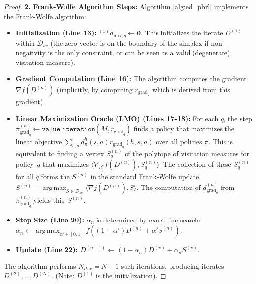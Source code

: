 \documentclass{article}
\DeclareMathOperator*{\argmax}{arg\,max}
\begin{document}
\begin{proof}
\textbf{2. Frank-Wolfe Algorithm Steps:}
Algorithm \ref{alg:ed_pbrl} implements the Frank-Wolfe algorithm:
\begin{itemize}
    \item \textbf{Initialization (Line 13):} ${}^{(1)}d_{\text{mix},q} \leftarrow \mathbf{0}$. This initializes the iterate $D^{(1)}$ within $\mathcal{D}_{sv}$ (the zero vector is on the boundary of the simplex if non-negativity is the only constraint, or can be seen as a valid (degenerate) visitation measure).
    \item \textbf{Gradient Computation (Line 16):} The algorithm computes the gradient $\nabla f(D^{(n)})$ (implicitly, by computing $r_{\text{grad}_q}$ which is derived from this gradient).
    \item \textbf{Linear Maximization Oracle (LMO) (Lines 17-18):} For each $q$, the step $\pi_{\text{grad}_q}^{(n)} \leftarrow \texttt{value\_iteration}(M, r_{\text{grad}_q})$ finds a policy that maximizes the linear objective $\sum_{s,a} d^h_{\pi}(s,a) r_{\text{grad}_q}(h,s,a)$ over all policies $\pi$. This is equivalent to finding a vertex $S_q^{(n)}$ of the polytope of visitation measures for policy~$q$ that maximizes $\langle \nabla_{d^h_q} f(D^{(n)}), S_q^{(n)} \rangle$. The collection of these $S_q^{(n)}$ for all $q$ forms the $S^{(n)}$ in the standard Frank-Wolfe update $S^{(n)} = \argmax_{S \in \mathcal{D}_{sv}} \langle \nabla f(D^{(n)}), S \rangle$. The computation of $d_{\text{grad}_q}^{(n)}$ from $\pi_{\text{grad}_q}^{(n)}$ yields this~$S^{(n)}$.
    \item \textbf{Step Size (Line 20):} $\alpha_n$ is determined by exact line search: $\alpha_n \leftarrow \argmax_{\alpha' \in [0,1]} f((1-\alpha')D^{(n)} + \alpha' S^{(n)})$.
    \item \textbf{Update (Line 22):} $D^{(n+1)} \leftarrow (1-\alpha_n)D^{(n)} + \alpha_n S^{(n)}$.
\end{itemize}
The algorithm performs $N_{iter} = N-1$ such iterations, producing iterates $D^{(2)}, \dots, D^{(N)}$. (Note: $D^{(1)}$ is the initialization).


\end{proof}
\end{document}
